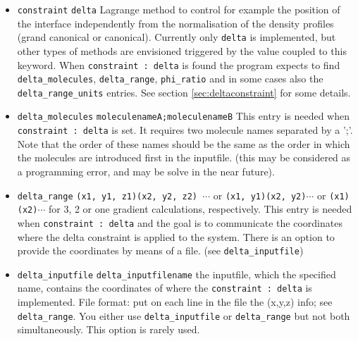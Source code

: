 \documentclass{article}
\begin{document}
\begin{itemize}
{\tt membrane} When you have the plan to link the bilayer to the lowerbound of your system (classical way to go), you can try this setting. Make sure that you have amphiphiles in your system or else the program can not decide on it's guess. Do not forget to reset the {\tt initial\_guess} to {\tt previous\_result} for subsequent calculations. (No strong guarantee that this guess is useful for you)
{\tt micelle} See previous item on {\tt membrane}. Make sure you have spherical or cylindrical lattice geometry selected. (No strong guarantee that this guess is useful for you)

\item {\tt constraint}  {\tt delta} Lagrange method to control for example the position of the interface independently from the normalisation of the density profiles (grand canonical or canonical). Currently only {\tt delta} is implemented, but other types of methods are envisioned triggered by the value coupled to this keyword. When {\tt constraint : delta} is found the program expects to find {\tt delta\_molecules}, {\tt delta\_range}, {\tt phi\_ratio} and in some cases also the {\tt delta\_range\_units} entries. See section \ref{sec:deltaconstraint} for some details. 

\item {\tt delta\_molecules} {\tt moleculenameA;moleculenameB} This entry  is needed when {\tt constraint : delta} is set. It requires two molecule names separated by a ';'. Note that the order of these names should be the same as the order in which the molecules are introduced first in the inputfile. (this may be considered as a programming error, and may be solve in the near future). 

\item {\tt delta\_range} {\tt (x1, y1, z1)(x2, y2, z2) $\cdots$} or {\tt (x1, y1)(x2, y2)$\cdots$} or {\tt (x1)(x2)$\cdots$} for 3, 2 or one gradient calculations, respectively. This entry is needed when {\tt constraint : delta} and the goal is to communicate the coordinates where the delta constraint is applied to the system. There is an option to provide the coordinates by means of a file. (see {\tt delta\_inputfile})

\item {\tt delta\_inputfile} {\tt delta\_inputfilename} the inputfile, which the specified name, contains the coordinates of where the {\tt constraint : delta} is implemented. File format: put on each line in the file the (x,y,z) info; see {\tt delta\_range}. You either use {\tt delta\_inputfile} or {\tt delta\_range} but not both simultaneously. This option is rarely used.


\end{itemize}
\end{document}

